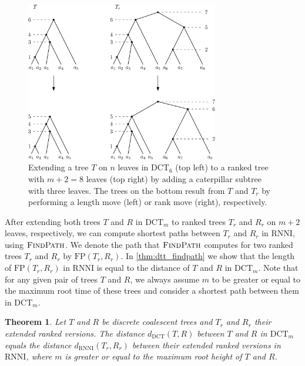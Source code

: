 \documentclass[11pt]{amsart}
\newtheorem{theorem}{Theorem}
\newcommand{\rnni}{\mathrm{RNNI}}
\newcommand{\findpath}{\textsc{FindPath}}
\newcommand{\fp}{\mathrm{FP}}
\newcommand{\dct}{\mathrm{DCT}}
\newcommand{\summary}[1]{} %
\begin{document}
\begin{figure}[ht]
	\includegraphics[width=0.75\textwidth]{dtt_to_ranked_tree.eps}
	\caption{Extending a tree $T$ on $n$ leaves in $\dct_6$ (top left) to a ranked tree with $m+2=8$ leaves (top right) by adding a caterpillar subtree with three leaves.
	The trees on the bottom result from $T$ and $T_r$ by performing a length move (left) or rank move (right), respectively.}
	\label{fig:dtt_to_ranked_tree}
\end{figure}

\summary{Moves on the extended ranked versions of trees -- $\rnni$ vs length moves}

\summary{How to compute shortest $\dct_m$-paths between trees with $\findpath$}
After extending both trees $T$ and $R$ in $\dct_m$ to ranked trees $T_r$ and $R_r$ on $m+2$ leaves, respectively, we can compute shortest paths between $T_r$ and $R_r$ in $\rnni$, using $\findpath$.
We denote the path that $\findpath$ computes for two ranked trees $T_r$ and $R_r$ by $\fp(T_r,R_r)$.
In \autoref{thm:dtt_findpath} we show that the length of $\fp(T_r,R_r)$ in $\rnni$ is equal to the distance of $T$ and $R$ in $\dct_m$.
Note that for any given pair of trees $T$ and $R$, we always assume $m$ to be greater or equal to the maximum root time of these trees and consider a shortest path between them in $\dct_m$.

\begin{theorem}
	\label{thm:dtt_findpath}
	Let $T$ and $R$ be discrete coalescent trees and $T_r$ and $R_r$ their extended ranked versions.
	The distance $d_\dct(T,R)$ between $T$ and $R$ in $\dct_m$ equals the distance $d_\rnni(T_r,R_r)$ between their extended ranked versions in $\rnni$, where $m$ is greater or equal to the maximum root height of $T$ and $R$.
\end{theorem}
\end{document}
